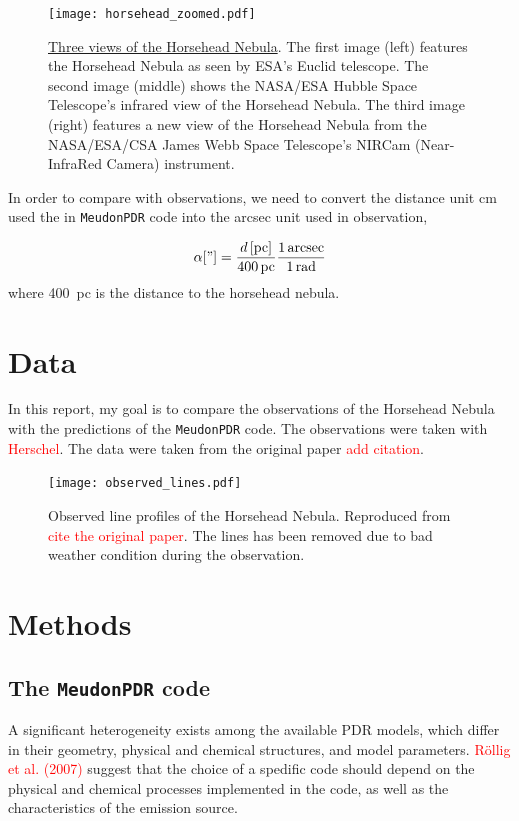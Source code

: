 \documentclass[12pt,a4paper]{article}
\newcommand{\mdpdr}{\texttt{MeudonPDR} code}
\newcommand{\qt}[1]{\textcolor{red}{#1}}
\begin{document}
\begin{figure}
    \centering
    \texttt{[image: horsehead\_zoomed.pdf]}
    \caption{\href{https://www.esa.int/ESA_Multimedia/Images/2024/04/Webb_captures_iconic_Horsehead_Nebula_in_unprecedented_detail}{Three views of the Horsehead Nebula}. The first image (left) features the Horsehead Nebula as seen by ESA's Euclid telescope. The second image (middle) shows the NASA/ESA Hubble Space Telescope's infrared view of the Horsehead Nebula. The third image (right) features a new view of the Horsehead Nebula from the NASA/ESA/CSA James Webb Space Telescope's NIRCam (Near-InfraRed Camera) instrument.}
\end{figure}

In order to compare with observations, we need to convert the distance unit \unit{cm} used the in \mdpdr{} into the \unit{arcsec} unit used in observation,

\begin{equation}
    \alpha["] = \frac{d\,[\unit{pc}]}{400\,\unit{pc}} \frac{1\,\unit{arcsec}}{1\,\unit{rad}}\textbf{}
\end{equation}
where \qty{400}{pc} \parencite{Menten_2007, Schlafly_2014} is the distance to the horsehead nebula.

\section{Data}
In this report, my goal is to compare the observations of the Horsehead Nebula with the predictions of the \mdpdr{}. The observations were taken with \qt{Herschel}. The data were taken from the original paper \qt{add citation}.
\begin{figure}
    \centering
    \texttt{[image: observed\_lines.pdf]}
    \caption{Observed line profiles of the Horsehead Nebula. Reproduced from \qt{cite the original paper}. The  lines has been removed due to bad weather condition during the observation.} \label{fig:observation}
\end{figure}


\section{Methods}
\subsection{The \mdpdr{}}
A significant heterogeneity exists among the available PDR models, which differ in their geometry, physical and chemical structures, and model parameters. \qt{Röllig et al. (2007)} suggest that the choice of a spedific code should depend on the physical and chemical processes implemented in the code, as well as the characteristics of the emission source. 
\end{document}
